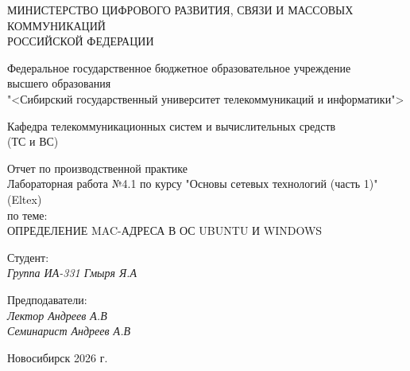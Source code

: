 \thispagestyle{empty}

\begin{center}
    МИНИСТЕРСТВО ЦИФРОВОГО РАЗВИТИЯ, СВЯЗИ И МАССОВЫХ КОММУНИКАЦИЙ \\ РОССИЙСКОЙ ФЕДЕРАЦИИ

    \vspace{20pt}

    Федеральное государственное бюджетное образовательное учреждение  \\  высшего образования \\
    "<Сибирский государственный университет телекоммуникаций и информатики"> \\

    \vspace{20pt}

    Кафедра телекоммуникационных систем и вычислительных средств \\  (ТС и ВС)
\end{center}

\vfill

\begin{center}
    Отчет по производственной практике \\  
    Лабораторная работа №4.1 по курсу "Основы сетевых технологий (часть 1)" (Eltex) \\
    \vspace{20pt}
    по теме: \\
    \uppercase{Определение MAC-адреса в ОС Ubuntu и Windows}
\end{center}

\vfill

    \noindent Студент: \\
    \textit{Группа ИА-331 \hfill Гмыря Я.А}

    \vspace{20pt}

    \noindent Предподаватели: \\
    \textit{Лектор \hfill Андреев А.В} \\
    \textit{Семинарист \hfill Андреев А.В}

\vfill

\begin{center}
    Новосибирск 2026 г.
\end{center}